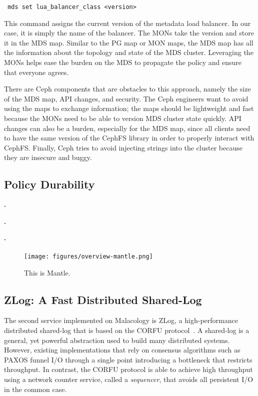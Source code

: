 \documentclass[10pt,twocolumn]{article}
\begin{document}
\noindent \texttt{ mds\ set\ lua\_balancer\_class\ \textless{}version\textgreater{}}

This command assigns the current version of the metadata load balancer. In our case, it is simply the name of the balancer. The MONs take the version and store it in the MDS map. Similar to the PG map or MON maps, the MDS map has all the information about the topology and state of the MDS cluster. Leveraging the MONs helps ease the burden on the MDS to propagate the policy and ensure that everyone agrees.

There are Ceph components that are obstacles to this approach, namely the size of the  MDS map, API changes, and security. The Ceph engineers want to avoid using the maps to exchange information; the maps should be lightweight and fast because the MONs need to be able to version MDS cluster state quickly. API changes can also be a burden, especially for the MDS map, since all clients need to have the same version of the CephFS library in order to properly interact with CephFS. Finally, Ceph tries to avoid injecting strings into the cluster because they are insecure and buggy. 

\subsection{Policy Durability}

- 

- 

- 


\begin{figure}[htbp]
\centering
\texttt{[image: figures/overview-mantle.png]}
\caption{This is Mantle.}
\end{figure}

\subsection{ZLog: A Fast Distributed Shared-Log}
\label{sec:zlog}

The second service implemented on Malacology is ZLog, a high-performance
distributed shared-log that is based on the CORFU
protocol~\cite{balakrishnan_corfu_2012}. A
shared-log is a general, yet powerful abstraction used to build many
distributed systems. However, existing implementations that rely on consensus
algorithms such as PAXOS funnel I/O through a single point introducing a
bottleneck that restricts throughput. In contrast, the CORFU protocol is able
to achieve high throughput using a network counter service, called a 
\emph{sequencer}, that avoids all persistent I/O in the common case.
\end{document}
